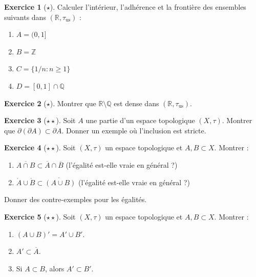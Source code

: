 \documentclass[12pt,a4paper,openany]{book}
\theoremstyle{definition}
\theoremstyle{cours}
\theoremstyle{coursnormal}
\newtheorem{exercice}{Exercice}[chapter]
\newcommand{\Z}{\mathbb{Z}}
\newcommand{\Q}{\mathbb{Q}}
\newcommand{\R}{\mathbb{R}}
\newcommand{\Int}[1]{\mathring{#1}}
\newcommand{\Cl}[1]{\overline{#1}}
\newcommand{\Fr}[1]{\partial #1}
\begin{document}
\begin{exercice}[$\star$]\label{exo:int-cl-calculs}
  Calculer l'intérieur, l'adhérence et la frontière des ensembles suivants dans $(\R, \tau_{\mathrm{us}})$ :
  \begin{enumerate}[label=(\alph*)]
    \item $A = (0,1]$
    \item $B = \Z$
    \item $C = \{1/n : n \geq 1\}$
    \item $D = [0,1] \cap \Q$
  \end{enumerate}
\end{exercice}

\begin{exercice}[$\star$]\label{exo:dense-R}
  Montrer que $\R \setminus \Q$ est dense dans $(\R, \tau_{\mathrm{us}})$.
\end{exercice}

\begin{exercice}[$\star\star$]\label{exo:frontiere-frontiere}
  Soit $A$ une partie d'un espace topologique $(X,\tau)$. Montrer que $\Fr{(\Fr{A})} \subset \Fr{A}$. Donner un exemple où l'inclusion est stricte.
\end{exercice}

\begin{exercice}[$\star\star$]\label{exo:int-cl-formules}
  Soit $(X,\tau)$ un espace topologique et $A, B \subset X$. Montrer :
  \begin{enumerate}[label=(\alph*)]
    \item $\Cl{A \cap B} \subset \Cl{A} \cap \Cl{B}$ (l'égalité est-elle vraie en général ?)
    \item $\Int{A} \cup \Int{B} \subset \Int{(A \cup B)}$ (l'égalité est-elle vraie en général ?)
  \end{enumerate}
  Donner des contre-exemples pour les égalités.
\end{exercice}

\begin{exercice}[$\star\star$]\label{exo:derive-proprietes}
  Soit $(X,\tau)$ un espace topologique et $A, B \subset X$. Montrer :
  \begin{enumerate}[label=(\alph*)]
    \item $(A \cup B)' = A' \cup B'$.
    \item $A' \subset \Cl{A}$.
    \item Si $A \subset B$, alors $A' \subset B'$.
  \end{enumerate}
\end{exercice}
\end{document}
